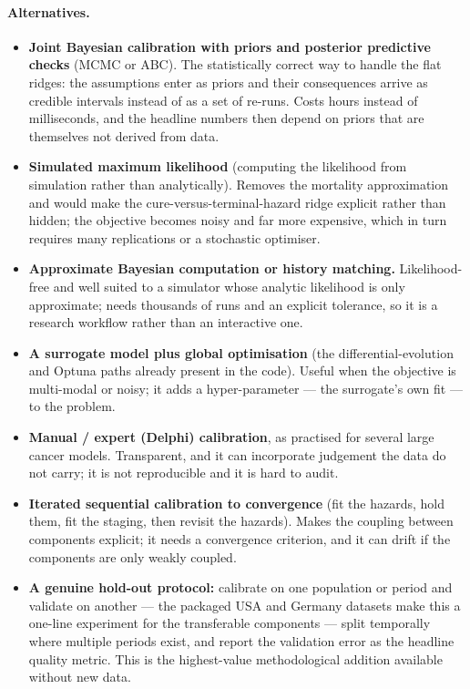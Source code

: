 \documentclass[12pt,a4paper]{article}
\newcommand{\alt}[1]{\paragraph{Alternatives.} #1}
\begin{document}
\alt{\begin{itemize}[nosep]
  \item \textbf{Joint Bayesian calibration with priors and posterior predictive checks} (MCMC or ABC). The
        statistically correct way to handle the flat ridges: the assumptions enter as priors and their
        consequences arrive as credible intervals instead of as a set of re-runs. Costs hours instead of
        milliseconds, and the headline numbers then depend on priors that are themselves not derived from
        data.
  \item \textbf{Simulated maximum likelihood} (computing the likelihood from simulation rather than
        analytically). Removes the mortality approximation and would make the cure-versus-terminal-hazard
        ridge explicit rather than hidden; the objective becomes noisy and far more expensive, which in turn
        requires many replications or a stochastic optimiser.
  \item \textbf{Approximate Bayesian computation or history matching.} Likelihood-free and well suited to a
        simulator whose analytic likelihood is only approximate; needs thousands of runs and an explicit
        tolerance, so it is a research workflow rather than an interactive one.
  \item \textbf{A surrogate model plus global optimisation} (the differential-evolution and Optuna paths
        already present in the code). Useful when the objective is multi-modal or noisy; it adds a
        hyper-parameter --- the surrogate's own fit --- to the problem.
  \item \textbf{Manual / expert (Delphi) calibration}, as practised for several large cancer models.
        Transparent, and it can incorporate judgement the data do not carry; it is not reproducible and it is
        hard to audit.
  \item \textbf{Iterated sequential calibration to convergence} (fit the hazards, hold them, fit the staging,
        then revisit the hazards). Makes the coupling between components explicit; it needs a convergence
        criterion, and it can drift if the components are only weakly coupled.
  \item \textbf{A genuine hold-out protocol:} calibrate on one population or period and validate on another
        --- the packaged USA and Germany datasets make this a one-line experiment for the transferable
        components --- split temporally where multiple periods exist, and report the validation error as the
        headline quality metric. This is the highest-value methodological addition available without new
        data.
\end{itemize}}
\end{document}
